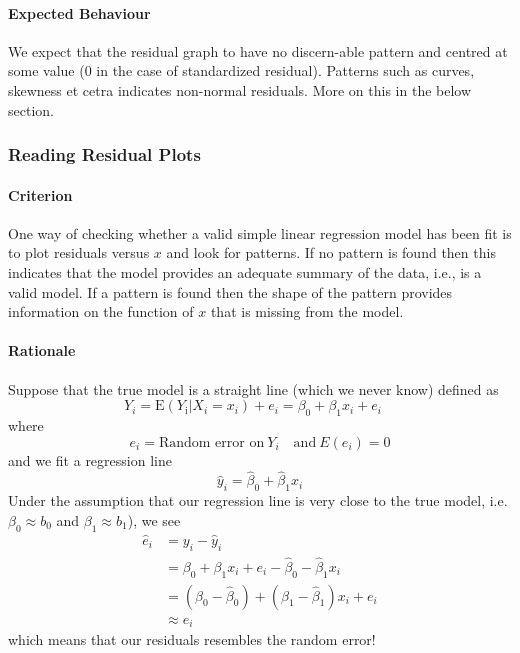 \documentclass[10pt]{article}
\begin{document}
\paragraph{Expected Behaviour} We expect that the residual graph to have no discern-able pattern and centred at some value (0 in the case of standardized residual). Patterns such as curves, skewness et cetra indicates non-normal residuals. More on this in the below section.

\subsubsection{Reading Residual Plots}
\paragraph{Criterion} One way of checking whether a valid simple linear regression model has been fit is to plot residuals versus $x$ and look for patterns. If no pattern is found then this indicates that the model provides an adequate summary of the data, i.e., is a valid model. If a pattern is found then the shape of the pattern provides information on the function of $x$ that is missing from the model.  

\paragraph{Rationale} Suppose that the true model is a straight line (which we never know) defined as
\begin{equation}
    Y_{i}=\mathrm{E}\left(Y_{\mathrm{i}} | X_{i}=x_{i}\right)+e_{i}=\beta_{0}+\beta_{1} x_{i}+e_{i} \quad 
\end{equation}
where
\begin{equation*}
    e_i = \text{Random error on}~Y_i\quad \text{and} ~E(e_i) = 0
\end{equation*}
and we fit a regression line
\begin{equation*}
    \hat{y}_{i}=\hat{\beta}_{0}+\hat{\beta}_{1} x_{i}
\end{equation*}
Under the assumption that our regression line is very close to the true model, i.e. $\beta_0 \approx b_0$ and $\beta_1 \approx b_1$), we see
\begin{align*}
    \hat{e}_{i} 
    &= y_{i}-\hat{y}_{i} \\
    &= \beta_{0}+\beta_{1} x_{i} + e_i - \hat{\beta}_{0} - \hat{\beta}_{1} x_{i} \\
    &= \left(\beta_{0}-\hat{\beta}_{0}\right)+\left(\beta_{1}-\hat{\beta}_{1}\right) x_{i}+e_{i} \\
    &\approx e_i
\end{align*}
which means that our residuals resembles the random error! 
\end{document}
